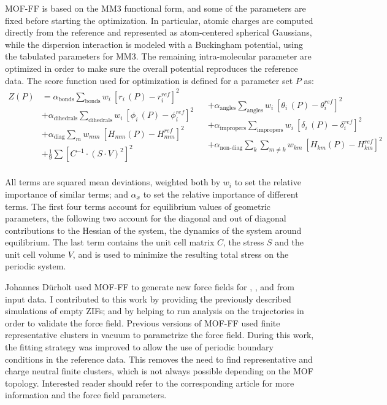 \documentclass[thesis]{subfiles}
\begin{document}
MOF-FF is based on the MM3 functional form\cite{Allinger1989}, and some of the
parameters are fixed before starting the optimization. In particular, atomic
charges are computed directly from the \abinitio reference and represented as
atom-centered spherical Gaussians, while the dispersion interaction is modeled
with a Buckingham potential, using the tabulated parameters for
MM3\cite{Allinger1994}. The remaining intra-molecular parameter are optimized in
order to make sure the overall potential reproduces the reference data. The
score function used for optimization is defined for a parameter set $P$ as:
\[
\begin{aligned}
    Z(P) &= \alpha_\text{bonds} \sum_\text{bonds} w_i \ \left[r_i\,(P) - r_i^{ref}\right]^2 \\
         &+ \alpha_\text{dihedrals} \sum_\text{dihedrals} w_i \ \left[\phi_i\,(P) - \phi_i^{ref}\right]^2 \\
         &+ \alpha_\text{diag} \sum_m w_{mm} \ \left[H_{mm}(P) - H_{mm}^{ref}\right]^2 \\
         &+ \frac 1 9 \sum \left[C^{-1} \cdot (S \cdot V)^2\right]^2 \\
\end{aligned}
\begin{aligned}
    &+ \alpha_\text{angles} \sum_\text{angles} w_i \ \left[\theta_i\,(P) - \theta_i^{ref}\right]^2 \\
    &+ \alpha_\text{impropers} \sum_\text{impropers} w_i \ \left[\delta_i\,(P) - \delta_i^{ref}\right]^2 \\
    &+ \alpha_\text{non-diag} \sum_k \sum_{m\neq k} w_{km} \ \left[H_{km}(P) - H_{km}^{ref}\right]^2 \\
    &~
\end{aligned}
\]

All terms are squared mean deviations, weighted both by $w_i$ to set the relative
importance of similar terms; and $\alpha_x$ to set the relative importance of
different terms. The first four terms account for equilibrium values of
geometric parameters, the following two account for the diagonal and out of
diagonal contributions to the Hessian of the system, \ie the dynamics of the
system around equilibrium. The last term contains the unit cell matrix $C$, the
stress $S$ and the unit cell volume $V$, and is used to minimize the resulting
total stress on the periodic system.

Johannes Dürholt used MOF-FF to generate new force fields for , \ZIFCl,
and \ZIFBr from \abinitio input data. I contributed to this work by providing
the previously described simulations of empty ZIFs; and by helping to run
analysis on the trajectories in order to validate the force field. Previous
versions of MOF-FF used finite representative clusters in vacuum to parametrize
the force field. During this work, the fitting strategy was improved to allow
the use of periodic boundary conditions in the reference data. This removes the
need to find representative and charge neutral finite clusters, which is not
always possible depending on the MOF topology. Interested reader should refer to
the corresponding article\cite{Duerholt2019} for more information and the force
field parameters.
\end{document}
